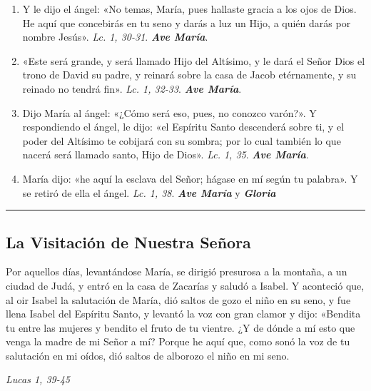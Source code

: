 \documentclass[11pt,a4paper]{book}
\begin{document}
\begin{enumerate}
        \item Y le dijo el ángel: «No temas, María, pues hallaste gracia a los ojos de Dios. He aquí que concebirás en tu seno y darás a luz un Hijo, 
                a quién darás por nombre Jesús». \emph{Lc. 1, 30-31}. \textbf{\emph{Ave María}}.

        \item «Este será grande, y será llamado Hijo del Altísimo, y le dará el Señor Dios el trono de David su padre, 
                y reinará sobre la casa de Jacob etérnamente, y su reinado no tendrá fin».  \emph{Lc. 1, 32-33}. \textbf{\emph{Ave María}}.

        \item Dijo María al ángel: «¿Cómo será eso, pues, no conozco varón?». Y respondiendo el ángel, le dijo: «el Espíritu Santo descenderá sobre ti, 
                y el poder del Altísimo te cobijará con su sombra; por lo cual también lo que nacerá será llamado santo, Hijo de Dios». 
                \emph{Lc. 1, 35}. \textbf{\emph{Ave María}}.

        \item María dijo: «he aquí la esclava del Señor; hágase en mí según tu palabra». Y se retiró de ella el ángel. \emph{Lc. 1, 38}. 
                \textbf{\emph{Ave María}} y \textbf{\emph{Gloria}}

    \end{enumerate}
    \rule{\textwidth}{0.5pt}
    

    \subsection*{La Visitación de Nuestra Señora}

    Por aquellos días, levantándose María, se dirigió presurosa a la montaña, a un ciudad de Judá, y entró en la casa de Zacarías y saludó a Isabel. 
    Y aconteció que, al oir Isabel la salutación de María, dió saltos de gozo el niño en su seno, y fue llena Isabel del Espíritu Santo, 
    y levantó la voz con gran clamor y dijo: «Bendita tu entre las mujeres y bendito el fruto de tu vientre. ¿Y de dónde a mí esto que venga la madre de mi Señor a mí? 
    Porque he aquí que, como sonó la voz de tu salutación en mi oídos, dió saltos de alborozo el niño en mi seno.
    
    \begin{flushright}
        \emph{Lucas 1, 39-45}
    \end{flushright}    
\end{document}

